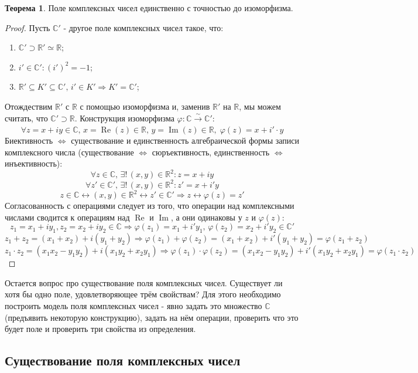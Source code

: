 \documentclass[12pt]{article}
\newcommand{\MR}{\mathbb{R}}
\newcommand{\MC}{\mathbb{C}}
\theoremstyle{definition}
\newtheorem{theorem}{Теорема}
\DeclareMathOperator{\IM}{\operatorname{Im}}
\DeclareMathOperator{\RE}{\operatorname{Re}}
\begin{document}
\begin{theorem}
	Поле комплексных чисел единственно с точностью до изоморфизма.
\end{theorem}
\begin{proof}
	Пусть $\MC'$ - другое поле комплексных чисел такое, что:
	\begin{enumerate}[label=\arabic*)]
		\item $\MC'\supset \MR' \simeq \MR$;
		\item $i' \in \MC' \colon (i')^2 = -1$;
		\item $\MR' \subseteq K' \subseteq \MC', \, i' \in K' \Rightarrow K' = \MC'$;
	\end{enumerate}
	Отождествим $\MR'$ с $\MR$ с помощью изоморфизма и, заменив $\MR'$ на $\MR$, мы можем считать, что $\MC' \supset \MR$. Конструкция изоморфизма $\varphi \colon \MC \xrightarrow[]{\sim}  \MC'$:
	$$
		\forall z = x + iy \in \MC, \, x = \RE{(z)} \in \MR, \, y = \IM{(z)} \in \MR, \; \varphi(z) = x + i'{\cdot}y
	$$
	Биективность $\Leftrightarrow$ существование и единственность алгебраической формы записи комплексного числа (существование $\Leftrightarrow$ сюръективность, единственность $\Leftrightarrow$ инъективность):
	$$
		\forall z \in \MC, \, \exists! \, (x,y) \in \MR^2 \colon z = x + iy
	$$
	$$
		\forall z' \in \MC', \, \exists! \, (x,y) \in \MR^2 \colon z' = x + i'y
	$$
	$$
		z \in \MC \leftrightarrow (x,y) \in \MR^2 \leftrightarrow z' \in \MC' \Rightarrow z \leftrightarrow \varphi(z) = z'
	$$
	Согласованность с операциями следует из того, что операции над комплексными числами сводится к операциям над $\RE$ и $\IM$, а они одинаковы у $z$ и $\varphi(z)$:
	$$
		z_1 = x_1 + iy_1, z_2 = x_2 + iy_2 \in \MC \Rightarrow \varphi(z_1) = x_1 + i'y_1, \, \varphi(z_2) = x_2 + i'y_2 \in \MC'
	$$
	$$
		z_1 + z_2 = (x_1 + x_2) + i(y_1 + y_2) \Rightarrow \varphi(z_1) + \varphi(z_2) = (x_1 + x_2) + i'(y_1 + y_2) = \varphi(z_1 + z_2)
	$$
	$$
		z_1{\cdot}z_2 = (x_1 x_2 - y_1 y_2) + i(x_1 y_2 + x_2 y_1) \Rightarrow  \varphi(z_1){\cdot}\varphi(z_2) = (x_1 x_2 - y_1 y_2) + i'(x_1 y_2 + x_2 y_1) = \varphi(z_1{\cdot}z_2)
	$$
\end{proof}
Остается вопрос про существование поля комплексных чисел. Существует ли хотя бы одно поле, удовлетворяющее трём свойствам? Для этого необходимо построить модель поля комплексных чисел - явно задать это множество $\MC$ (предъявить некоторую конструкцию), задать на нём операции, проверить что это будет поле и проверить три свойства из определения.
\newpage
\subsection*{Существование поля комплексных чисел}
\end{document}
